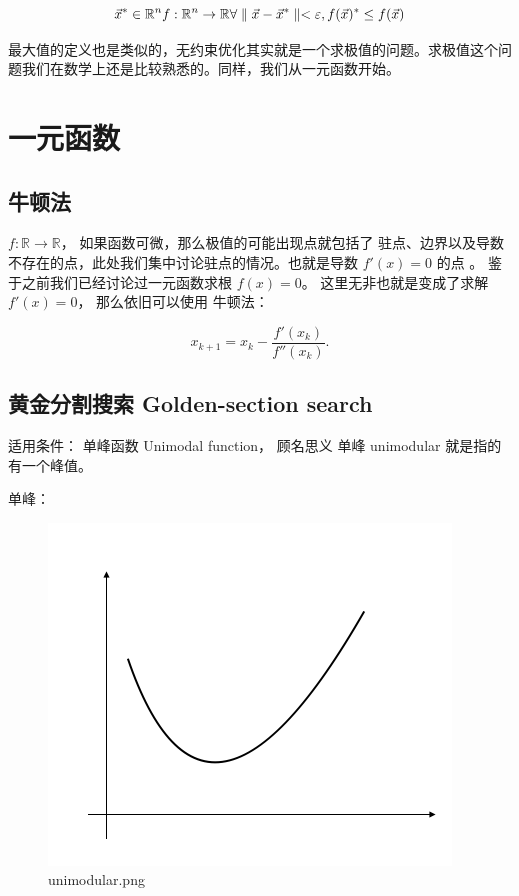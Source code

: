 \documentclass[
]{book}
\begin{document}
\[
\vec{x}^* \in  \mathbb{R}^n \\
f: \mathbb{R}^n \to \mathbb{R} \\
\forall \parallel \vec{x} - \vec{x}^* \parallel < \varepsilon,   f(\vec{x})^* \le f(\vec{x}) 
\]

最大值的定义也是类似的，无约束优化其实就是一个求极值的问题。求极值这个问题我们在数学上还是比较熟悉的。同样，我们从一元函数开始。

\hypertarget{ux4e00ux5143ux51fdux6570}{%
\section{一元函数}\label{ux4e00ux5143ux51fdux6570}}

\hypertarget{ux725bux987fux6cd5-1}{%
\subsection{牛顿法}\label{ux725bux987fux6cd5-1}}

\(f: \mathbb{R} \to \mathbb{R}\)， 如果函数可微，那么极值的可能出现点就包括了 驻点、边界以及导数不存在的点，此处我们集中讨论驻点的情况。也就是导数 \(f'(x) = 0\) 的点 。 鉴于之前我们已经讨论过一元函数求根 \(f(x) = 0\)。 这里无非也就是变成了求解 \(f'(x) = 0\)， 那么依旧可以使用 牛顿法：

\[
{\displaystyle x_{k+1} = x_{k}-{\frac {f'(x_{k})}{f''(x_{k})}}.}
\]

\hypertarget{ux9ec4ux91d1ux5206ux5272ux641cux7d22-golden-section-search}{%
\subsection{黄金分割搜索 Golden-section search}\label{ux9ec4ux91d1ux5206ux5272ux641cux7d22-golden-section-search}}

适用条件： 单峰函数 Unimodal function， 顾名思义 单峰 unimodular 就是指的有一个峰值。

单峰：

\begin{figure}
\centering
\includegraphics{images/unimodular.png}
\caption{unimodular.png}
\end{figure}
\end{document}
